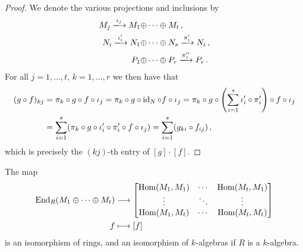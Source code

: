 \begin{proof}
  We denote the various projections and inclusions by
  \begin{align*}
                              M_j
    \xlongrightarrow{\iota_j} M_1 \oplus &\dotsb \oplus M_t \,,
    \\
                                N_i
    \xlongrightarrow{\iota'_i}  N_1 \oplus &\dotsb \oplus N_s
    \xlongrightarrow{\pi'_i}    N_i \,,
    \\
                              P_1 \oplus &\dotsb \oplus P_r
    \xlongrightarrow{\pi''_r} P_r \,.
  \end{align*}
  For all $j = 1, \dotsc, t$, $k = 1, \dotsc, r$ we then have that
  \begin{align*}
        (g \circ f)_{kj}
    &=  \pi_k \circ g \circ f \circ \iota_j
     =  \pi_k \circ g \circ \operatorname{id}_N \circ f \circ \iota_j
     =  \pi_k \circ g \circ \left( \sum_{i=1}^s \iota'_i \circ \pi'_i \right) \circ f \circ \iota_j \\
    &=  \sum_{i=1}^s ( \pi_k \circ g \circ \iota'_i \circ \pi'_i \circ f \circ \iota_j )
     =  \sum_{i=1}^s ( g_{ki} \circ f_{ij} ) \,,
  \end{align*}
  which is precisely the $(kj)$-th entry of $[g] \cdot [f]$.
\end{proof}


\begin{corollary}
  \label{corollary: endomorphisms of direct sum}
  The map
  \begin{align*}
              \operatorname{End}_R(M_1 \oplus \dotsb \oplus M_t)
    &\longrightarrow  \begin{bmatrix}
                \operatorname{Hom}(M_1, M_1)  & \cdots  & \operatorname{Hom}(M_t, M_1)  \\
                \vdots          & \ddots  & \vdots          \\
                \operatorname{Hom}(M_1, M_t)  & \cdots  & \operatorname{Hom}(M_t, M_t)
              \end{bmatrix}
    \\
                  f
    &\longmapsto  [f]
  \end{align*}
  is an isomorphism of rings, and an isomorphism of $k$-algebras if $R$ is a $k$-algebra.
\end{corollary}



